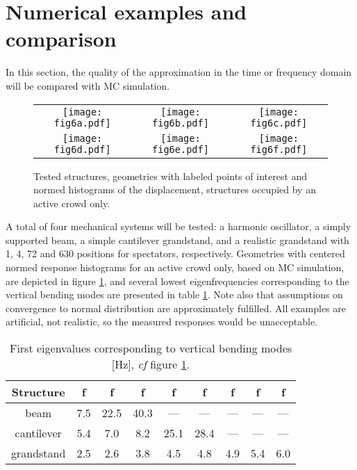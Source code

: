 \documentclass[preprint,12pt,authoryear]{elsarticle}
\begin{document}
\section{Numerical examples and comparison}
\label{examples}
In this section, the quality of the approximation in the time or frequency domain will be compared with MC simulation.
\begin{figure}
	\centering
	\begin{tabular}{ccc}
  \texttt{[image: fig6a.pdf]} &
  \texttt{[image: fig6b.pdf]} &
  \texttt{[image: fig6c.pdf]} \\
  \texttt{[image: fig6d.pdf]} &
  \texttt{[image: fig6e.pdf]} &
  \texttt{[image: fig6f.pdf]}
  \end{tabular}
	\caption{Tested structures, geometries with labeled points of interest and normed histograms of the displacement, structures occupied by an active crowd only.}
	\label{4fig1}
\end{figure}
A total of four mechanical systems will be tested: a harmonic oscillator, a simply supported beam, a simple cantilever grandstand, and a realistic grandstand with 1, 4, 72 and 630 positions for spectators, respectively. Geometries with centered normed response histograms for an active crowd only, based on MC simulation, are depicted in figure \ref{4fig1}, and several lowest eigenfrequencies corresponding to the vertical bending modes are presented in table \ref{4tab1}. Note also that assumptions on convergence to normal distribution are approximately fulfilled. All examples are artificial, not realistic, so the measured responses would be unacceptable. 
\begin{table}
	\centering
	\caption{First eigenvalues corresponding to vertical bending modes [Hz], \textit{cf} figure \ref{4fig1}.}
	\begin{tabular}{|c|c|c|c|c|c|c|c|c|}
		\hline
		Structure & f & f & f & f & f  & f & f & f \\\hline
		beam & 7.5 & 22.5 & 40.3 & --- & --- & --- & --- & --- \\
		cantilever & 5.4 & 7.0 & 8.2 & 25.1 & 28.4 & --- & --- & --- \\
		grandstand & 2.5 & 2.6 & 3.8 & 4.5 & 4.8 & 4.9 & 5.4 & 6.0 \\\hline
	\end{tabular}
	\label{4tab1}
\end{table}
\end{document}
